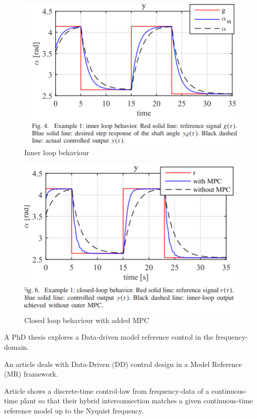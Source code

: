 \documentclass[]{final_report}
\begin{document}
\begin{figure} [h!]
\centerline{\includegraphics[width=.75\textwidth]{Screenshots for related work/constraint_data_driven_control_screenshot2_innerloop.png}}
\caption{Inner loop behaviour
\cite{piga2017direct}}
\label{fig:innerloopcontroller}
\end{figure}

\begin{figure} [h!]
\centerline{\includegraphics[width=.75\textwidth]{Screenshots for related work/constraint_data_driven_control_screenshot2_usingMPC.png}}
\caption{Closed loop behaviour with added MPC
\cite{piga2017direct}}
\label{fig:controllerwithMPC}
\end{figure}

A PhD thesis \cite{kergus} explores a Data-driven model reference control in the frequency-domain. 

An article \cite{CAMPESTRINI20172628} deals with Data-Driven (DD) control design in a Model Reference (MR) framework. 

Article \cite{vuillemin2019hybrid} shows a discrete-time control-law from frequency-data of a continuous-time plant so that their hybrid interconnection matches a given continuous-time reference model up to the Nyquist
frequency. 
\end{document}
